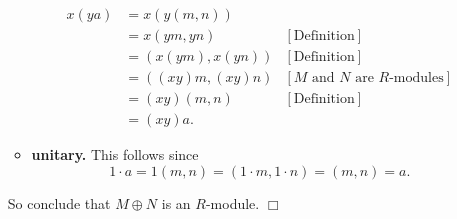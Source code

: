 \documentclass[9pt]{article}
\newcommand{\qed}{\hfill \ensuremath{\Box}}
\begin{document}
\begin{enumerate}
\begin{itemize}
               \begin{align*}
                  x(ya) &= x(y(m, n)) \\
                     &= x(ym, yn) &[\text{Definition}] \\
                     &= (x(ym), x(yn)) &[\text{Definition}] \\
                     &= ((xy)m, (xy)n) 
                        &[M\text{ and }N \text{ are } R\text{-modules}] \\
                     &= (xy)(m, n) &[\text{Definition}] \\
                     &= (xy)a.
               \end{align*}
         \item \textbf{unitary.} This follows since
               $$1\cdot a = 1(m, n) = (1 \cdot m, 1 \cdot n) = (m, n) = a.$$
      \end{itemize}
      So conclude that $M \oplus N$ is an $R$-module. \qed
\end{enumerate}
\end{document}
